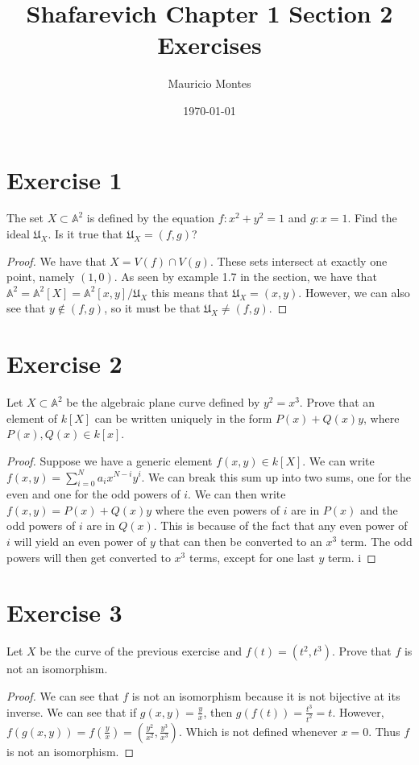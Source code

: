 \documentclass[12pt]{article}
\title{Shafarevich Chapter 1 Section 2 Exercises}
\author{Mauricio Montes}
\date{\today}
\begin{document}
\maketitle

\section*{Exercise 1}

The set $ X \subset \mathbb{A}^2 $ is defined by the equation $ f : x^2 + y^2 = 1$ 
and $ g: x = 1$. Find the ideal $\mathfrak{U}_X$. Is it true that $\mathfrak{U}_X = (f,g)$?


\begin{proof}

  We have that $X = V(f) \cap V(g)$. These sets intersect at exactly one point, namely $(1,0)$. As
  seen by example 1.7 in the section, we have that 
  $\mathbb{A}^2 = \mathbb{A}^2 [X] = \mathbb{A}^2 [x,y] / \mathfrak{U}_X$
  this means that $\mathfrak{U}_X = (x,y)$. However, we can also see that $ y \notin (f,g)$, so it must
  be that $\mathfrak{U}_X \neq (f,g)$.

\end{proof}

\section*{Exercise 2}

Let $X \subset \mathbb{A}^2$ be the algebraic plane curve defined by $ y^2 =x^3$. Prove that an
element of $k[X]$ can be written uniquely in the form $P(x) + Q(x)y$, where $P(x),Q(x) \in k[x]$.

\begin{proof}

  Suppose we have a generic element $f(x,y) \in k[X]$. We can write 
  $f(x,y) = \sum_{i=0}^{N}a_{i}x^{N-i}y^{i}$. We can break this sum up into two sums, one for the even
  and one for the odd powers of $i$. We can then write $f(x,y) = P(x) + Q(x)y$ where the even powers
  of $i$ are in $P(x)$ and the odd powers of $i$ are in $Q(x)$. This is because of the fact that any
  even power of $i$ will yield an even power of $y$ that can then be converted to an $x^3$ term. The
  odd powers will then get converted to $x^3$ terms, except for one last $y$ term. i

\end{proof}

\section*{Exercise 3}

Let $X$ be the curve of the previous exercise and $f(t) = (t^2,t^3)$. Prove that $f$ is not an
isomorphism.

\begin{proof}

  We can see that $f$ is not an isomorphism because it is not bijective at its inverse. We can see
  that if $g(x,y) = \frac{y}{x}$, then $g(f(t)) = \frac{t^3}{t^2} = t$. However, 
  $f(g(x,y)) = f(\frac{y}{x}) = (\frac{y^2}{x^2},\frac{y^3}{x^3})$. Which is not defined whenever
  $x=0$. Thus $f$ is not an isomorphism.

\end{proof}
\end{document}
